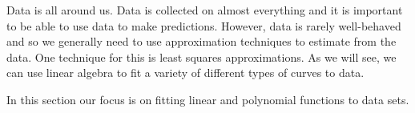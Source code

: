  \label{chap:least_squares}

\vspace*{-17 pt}

\vspace*{13 pt}


\label{sec:appl_fit_func}

Data is all around us. Data is collected on almost everything and it is important to be able to use data to make predictions. However, data is rarely well-behaved and so we generally need to use approximation techniques to estimate from the data. One technique for this is least squares approximations. As we will see, we can use linear algebra to fit a variety of different types of curves to data. 


\label{sec:ls_intro}

In this section our focus is on fitting linear and polynomial functions to data sets. 

